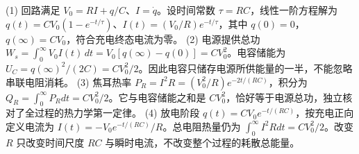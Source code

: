 (1) 回路满足 \(V_0=RI+q/C\)、\(I=\dot q\)。设时间常数 \(\tau=RC\)，线性一阶方程解为 \(q(t)=CV_0(1-e^{-t/\tau})\)、\(I(t)=(V_0/R)e^{-t/\tau}\)，其中 \(q(0)=0\)，\(q(\infty)=CV_0\)，符合充电终态电流为零。
(2) 电源提供总功 \(W_s=\int_0^\infty V_0I(t)\,dt=V_0[q(\infty)-q(0)]=CV_0^2\)。电容储能为 \(U_C=q(\infty)^2/(2C)=CV_0^2/2\)。因此电容只储存电源所供能量的一半，不能忽略串联电阻消耗。
(3) 焦耳热率 \(P_R=I^2R=(V_0^2/R)e^{-2t/(RC)}\)，积分为 \(Q_R=\int_0^\infty P_Rdt=CV_0^2/2\)。它与电容储能之和是 \(CV_0^2\)，恰好等于电源总功，独立核对了全过程的热力学第一定律。
(4) 放电阶段 \(q(t)=CV_0e^{-t/(RC)}\)，按充电正向定义电流为 \(I(t)=-V_0e^{-t/(RC)}/R\)。总电阻热量仍为 \(\int_0^\infty I^2Rdt=CV_0^2/2\)。改变 \(R\) 只改变时间尺度 \(RC\) 与瞬时电流，不改变整个过程的耗散总能量。
